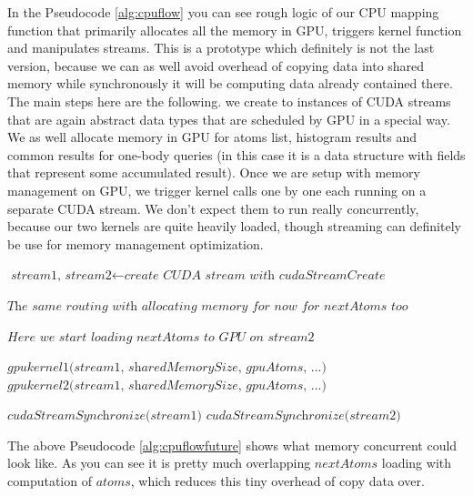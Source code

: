 \documentclass[12pt,letterpaper]{report}
\begin{document}
In the Pseudocode \ref{alg:cpuflow} you can see rough logic of our CPU mapping function that primarily allocates all the memory in GPU, triggers kernel function and manipulates streams. This is a prototype which definitely is not the last version, because we can as well avoid overhead of copying data into shared memory while synchronously it will be computing data already contained there. The main steps here are the following. we create to instances of CUDA streams that are again abstract data types that are scheduled by GPU in a special way. We as well allocate memory in GPU for atoms list, histogram results and common results for one-body queries (in this case it is a data structure with fields that represent some accumulated result). Once we are setup with memory management on GPU, we trigger kernel calls one by one each running on a separate CUDA stream. We don't expect them to run really concurrently, because our two kernels are quite heavily loaded, though streaming can definitely be use for memory management optimization.
\begin{algorithm}
\caption{Main algorithm in CPU for managing data and pushing to GPU}
\label{alg:cpuflowfuture}
\begin{algorithmic}[1]

\State $\textit{stream1, stream2} \gets \textit{create CUDA stream with cudaStreamCreate}$

\State
\State $\textit{The same routing with allocating memory for now for nextAtoms too}$

\State
\State $\textit{Here we start loading nextAtoms to GPU on stream2 }$
\State


\State $\textit{gpukernel1(stream1, sharedMemorySize, gpuAtoms, ...)}$
\State $\textit{gpukernel2(stream1, sharedMemorySize, gpuAtoms, ...)}$

\State
\State $\textit{cudaStreamSynchronize(stream1)}$
\State $\textit{cudaStreamSynchronize(stream2)}$

\EndFor

\EndProcedure
\end{algorithmic}
\end{algorithm}

The above Pseudocode \ref{alg:cpuflowfuture} shows what memory concurrent could look like. As you can see it is pretty much overlapping $nextAtoms$ loading with computation of $atoms$, which reduces this tiny overhead of copy data over.
\end{document}
